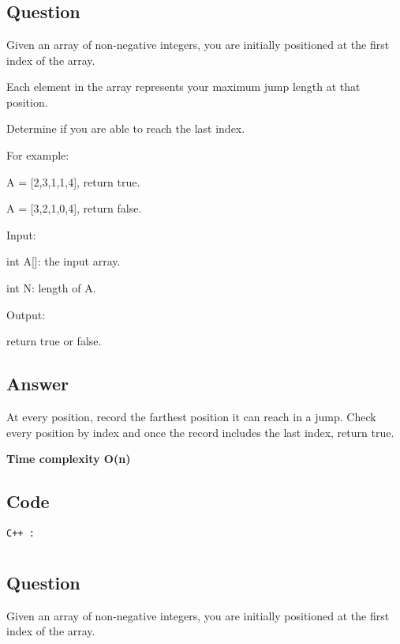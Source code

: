 \section{}
\subsection{Question}
Given an array of non-negative integers, you are initially positioned at the first index of the array.

Each element in the array represents your maximum jump length at that position.

Determine if you are able to reach the last index.

For example:

A = [2,3,1,1,4], return true.

A = [3,2,1,0,4], return false.

Input:

int A[]: the input array.

int N: length of A.

Output:

return true or false.
\subsection{Answer}

At every position, record the farthest position it can reach in a jump. Check every position by index and once the record includes the last index, return true.

\textbf{\color{red}Time complexity O(n)}
\subsection{Code}
\texttt{C++ :}


\newpage
\section{}
\subsection{Question}
Given an array of non-negative integers, you are initially positioned at the first index of the array.

